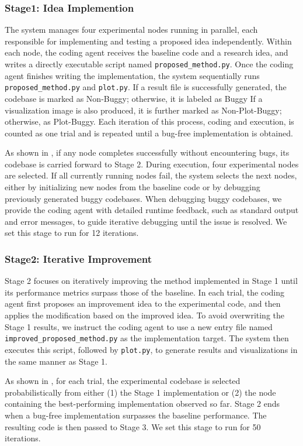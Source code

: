 \subsubsection{Stage1: Idea Implemention}
The system manages four experimental nodes running in parallel, each responsible for implementing and testing a proposed idea independently.
Within each node, the coding agent receives the baseline code and a research idea, and writes a directly executable script named \texttt{proposed\_method.py}.
Once the coding agent finishes writing the implementation, the system sequentially runs \texttt{proposed\_method.py} and \texttt{plot.py}. 
If a result file is successfully generated, the codebase is marked as Non-Buggy; otherwise, it is labeled as Buggy
If a visualization image is also produced, it is further marked as Non-Plot-Buggy; otherwise, as Plot-Buggy.
Each iteration of this process, coding and execution, is counted as one trial and is repeated until a bug-free implementation is obtained.

As shown in , if any node completes successfully without encountering bugs, its codebase is carried forward to Stage 2. 
During execution, four experimental nodes are selected. If all currently running nodes fail, the system selects the next nodes, either by initializing new nodes from the baseline code or by debugging previously generated buggy codebases.
When debugging buggy codebases, we provide the coding agent with detailed runtime feedback, such as standard output and error messages, to guide iterative debugging until the issue is resolved.
We set this stage to run for 12 iterations.

\subsubsection{Stage2: Iterative Improvement}
Stage 2 focuses on iteratively improving the method implemented in Stage 1 until its performance metrics surpass those of the baseline.
In each trial, the coding agent first proposes an improvement idea to the experimental code, and then applies the modification based on the improved idea.
To avoid overwriting the Stage 1 results, we instruct the coding agent to use a new entry file named \texttt{improved\_proposed\_method.py} as the implementation target.
The system then executes this script, followed by \texttt{plot.py}, to generate results and visualizations in the same manner as Stage 1.

As shown in , for each trial, the experimental codebase is selected probabilistically from either (1) the Stage 1 implementation or (2) the node containing the best-performing implementation observed so far.
Stage 2 ends when a bug-free implementation surpasses the baseline performance.
The resulting code is then passed to Stage 3.
We set this stage to run for 50 iterations.


